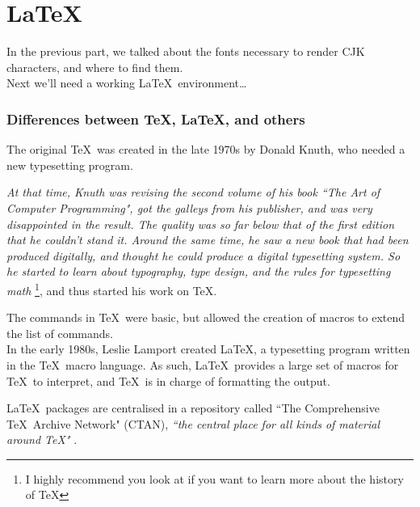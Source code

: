 
\part{\LaTeX} \label{latex}

\renewcommand{\currentPart}{\LaTeX}

In the previous part, we talked about the fonts necessary to render CJK characters, and where to find them. \\

Next we'll need a working \LaTeX\ environment\dots

\section*{Differences between \TeX, \LaTeX, and others}

The original \TeX\ was created in the late 1970s by Donald Knuth, who needed a new typesetting program. 

\emph{At that time, Knuth was revising the second volume of his book \emph{``The Art of Computer Programming"},  got the galleys from his publisher, and was very disappointed in the result. The quality was so far below that of the first edition that he couldn't stand it. Around the same time, he saw a new book that had been produced digitally, and thought he could produce a digital typesetting system. So he started to learn about typography, type design, and the rules for typesetting math} \citep{tug}\footnote{I highly recommend you look at \cite{tug} if you want to learn more about the history of \TeX}, and thus started his work on \TeX.


The commands in \TeX\ were basic, but allowed the creation of macros to extend the list of commands. \\

In the early 1980s, Leslie Lamport created \LaTeX, a typesetting program written in the \TeX\ macro language. \citep{wiki-latex} As such, \LaTeX\ provides a large set of macros for \TeX\ to interpret, and \TeX\ is in charge of formatting the output.


\LaTeX\ packages are centralised in a repository called ``The Comprehensive \TeX\ Archive Network" (CTAN), \emph{``the central place for all kinds of material around \TeX"} \citep{CTAN}.

